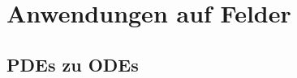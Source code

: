 %
%
%
%



\section{Anwendungen auf Felder\label{fourier:section:teil0}}


\subsection{PDEs zu ODEs\label{fourier:subsection:anwendungenFelder}}



